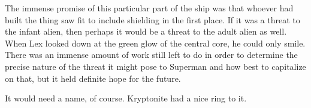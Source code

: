 The immense promise of this particular part of the ship was that whoever
had built the thing saw fit to include shielding in the first place. If
it was a threat to the infant alien, then perhaps it would be a threat
to the adult alien as well. When Lex looked down at the green glow of
the central core, he could only smile. There was an immense amount of
work still left to do in order to determine the precise nature of the
threat it might pose to Superman and how best to capitalize on that, but
it held definite hope for the future.

It would need a name, of course. Kryptonite had a nice ring to it.

